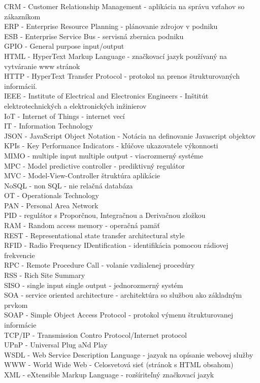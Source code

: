 CRM - Customer Relationship Management - aplikácia na správu vzťahov so zákazníkom \\
ERP - Enterprise Resource Planning - plánovanie zdrojov v podniku \\
ESB - Enterprise Service Bus - servisná zbernica podniku \\
GPIO - General purpose input/output \\
HTML - HyperText Markup Language - značkovací jazyk používaný na vytváranie www stránok \\
HTTP - HyperText Transfer Protocol - protokol na prenos štrukturovaných informácií. \\
IEEE - Institute of Electrical and Electronics Engineers - Inštitút elektrotechnických a elektronických inžinierov \\
IoT - Internet of Things - internet vecí \\
IT - Information Technology \\
JSON - JavaScript Object Notation - Notácia na definovanie Javascript objektov \\
KPIs - Key Performance Indicators - kľúčove ukazovatele výkonnosti \\
MIMO - multiple input multiple output - viacrozmerný systéme \\
MPC - Model predictive controller - prediktivný regulátor \\
MVC - Model-View-Controller štruktúra aplikácie \\
NoSQL - non SQL - nie relačná databáza \\
OT - Operationals Technology \\
PAN - Personal Area Network \\
PID - regulátor s Proporčnou, Integračnou a Derivačnou zložkou \\
RAM - Random access memory - operačná pamäť \\
REST - Representational state transfer architectural style \\
RFID - Radio Frequency IDentification - identifikácia pomocou rádiovej frekvencie \\
RPC - Remote Procedure Call - volanie vzdialenej procedúry \\
RSS - Rich Site Summary \\
SISO - single input single output - jednorozmerný systém \\
SOA - service oriented architecture - architektúra so službou ako základným prvkom \\
SOAP - Simple Object Access Protocol - protokol výmenu štrukturovanej informácie \\
TCP/IP - Transmission Contro Protocol/Internet protocol \\ 
UPnP - Universal Plug aNd Play \\
WSDL - Web Service Description Language - jazyak na opísanie webovej služby \\
WWW - World Wide Web - Celosvetová sieť (stránok s HTML obsahom) \\
XML - eXtensible Markup Language - rozšíriteľný značkovací jazyk
